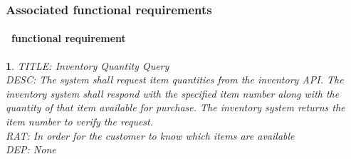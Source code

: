 \documentclass{scrreprt}
\theoremstyle{funreq}
\newtheorem{funreq}{}
\newcommand*{\reqref}[1]{\hyperref[#1]{FR\ref*{#1}}}
\begin{document}
	\subsubsection{Associated functional requirements}
	\paragraph[]{\Subsectionname ~functional requirement }
	\begin{funreq}
		\label{inventory_quantity}
		TITLE: Inventory Quantity Query\\
		DESC: The system shall request item quantities from the inventory API.  The inventory system shall respond with the specified item number along with the quantity of that item available for purchase. The inventory system returns the item number to verify the request.\\
		RAT: In order for the customer to know which items are available\\
		DEP: None\\
	\end{funreq}
	
	
\end{document}
